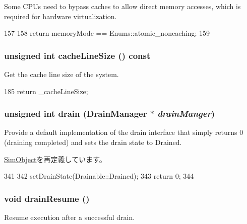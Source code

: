 Some CPUs need to bypass caches to allow direct memory accesses, which is required for hardware virtualization. 


\begin{DoxyCode}
157                               {
158         return memoryMode == Enums::atomic_noncaching;
159     }
\end{DoxyCode}
\hypertarget{classSystem_ac1f842b56d922c001dda5262b4cccbc6}{
\subsubsection[{cacheLineSize}]{\setlength{\rightskip}{0pt plus 5cm}unsigned int cacheLineSize () const}}
\label{classSystem_ac1f842b56d922c001dda5262b4cccbc6}
Get the cache line size of the system. 


\begin{DoxyCode}
185 { return _cacheLineSize; }
\end{DoxyCode}
\hypertarget{classSystem_aa8a18d230dba7a674ac8a0b4f35bc36a}{
\subsubsection[{drain}]{\setlength{\rightskip}{0pt plus 5cm}unsigned int drain ({\bf DrainManager} $\ast$ {\em drainManger})}}
\label{classSystem_aa8a18d230dba7a674ac8a0b4f35bc36a}
Provide a default implementation of the drain interface that simply returns 0 (draining completed) and sets the drain state to Drained. 

\hyperlink{classSimObject_a6bf479c521c7c3eb473822d953275b26}{SimObject}を再定義しています。


\begin{DoxyCode}
341 {
342     setDrainState(Drainable::Drained);
343     return 0;
344 }
\end{DoxyCode}
\hypertarget{classSystem_a8f020d3237536fe007fc488c4125c5d8}{
\subsubsection[{drainResume}]{\setlength{\rightskip}{0pt plus 5cm}void drainResume ()}}
\label{classSystem_a8f020d3237536fe007fc488c4125c5d8}
Resume execution after a successful drain.

